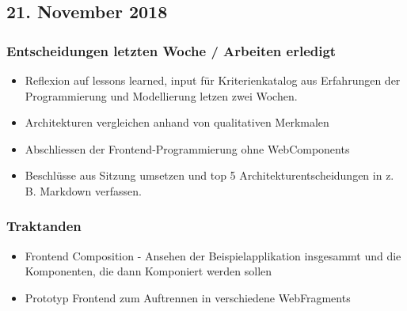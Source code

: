 \documentclass{article}
\begin{document}
    
\subsection{21. November 2018} \label{chap:Protokols:21nov2018}

\subsubsection{Entscheidungen letzten Woche / Arbeiten erledigt}
\begin{itemize}
    \item Reflexion auf lessons learned, input für Kriterienkatalog aus Erfahrungen der Programmierung und Modellierung letzen zwei Wochen.
    \item Architekturen vergleichen anhand von qualitativen Merkmalen
    \item Abschliessen der Frontend-Programmierung ohne WebComponents \checkmark
    \item Beschlüsse aus Sitzung umsetzen und top 5 Architekturentscheidungen in z. B. Markdown verfassen.\checkmark
\end{itemize}

\subsubsection{Traktanden}
\begin{itemize}
    \item Frontend Composition - Ansehen der Beispielapplikation insgesammt und die Komponenten, die dann Komponiert werden sollen
    \item Prototyp Frontend zum Auftrennen in verschiedene WebFragments
\end{itemize}
\end{document}
